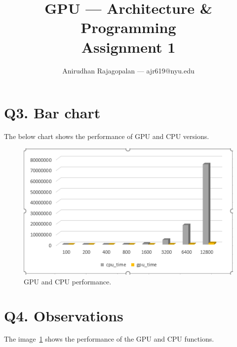 \documentclass{article}
\begin{document}
\title{GPU --- Architecture \& Programming \\ Assignment 1}
\author{Anirudhan Rajagopalan --- ajr619@nyu.edu}
\maketitle

\newpage

\section{Q3. Bar chart}
The below chart shows the performance of GPU and CPU versions.
\begin{figure}[ht!]
  \centering
  \includegraphics[width=1\textwidth]{capture}
  \caption{GPU and CPU performance.\label{fig:observation}}
\end{figure}


\section{Q4. Observations}
The image~\ref{fig:observation} shows the performance of the GPU and CPU functions.
\end{document}
